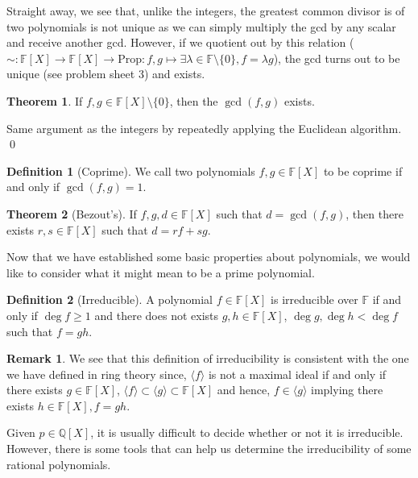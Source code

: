 \documentclass[
]{article}
\theoremstyle{definition}
\newtheorem{theorem}{Theorem}
\newtheorem*{remark}{Remark}
\theoremstyle{definition}
\newtheorem{definition}{Definition}[section]
\begin{document}
Straight away, we see that, unlike the integers, the greatest common
divisor is of two polynomials is not unique as we can simply multiply
the gcd by any scalar and receive another gcd. However, if we quotient
out by this relation
(\(\sim : \mathbb{F}[X] \to \mathbb{F}[X] \to \text{Prop} : f, g \mapsto \exists \lambda \in \mathbb{F} \setminus \{0\}, f = \lambda g\)),
the gcd turns out to be unique (see problem sheet 3) and exists.

\begin{theorem}
  If \(f, g \in \mathbb{F}[X] \setminus \{0\}\), then the \(\gcd(f, g)\) exists.
\end{theorem}
\proof

Same argument as the integers by repeatedly applying the Euclidean
algorithm. \qed

\begin{definition}[Coprime]
  We call two polynomials \(f, g \in \mathbb{F}[X]\) to be coprime if and only if
  \(\gcd(f, g) = 1\).
\end{definition}

\begin{theorem}[Bezout's]
  If \(f, g, d \in \mathbb{F}[X]\) such that \(d = \gcd(f, g)\), then there 
  exists \(r, s \in \mathbb{F}[X]\) such that \(d = r f + s g\).
\end{theorem}

Now that we have established some basic properties about polynomials, we
would like to consider what it might mean to be a prime polynomial.

\begin{definition}[Irreducible]
  A polynomial \(f \in \mathbb{F}[X]\) is irreducible over \(\mathbb{F}\) if 
  and only if \(\deg f \ge 1\) and there does not exists 
  \(g, h \in \mathbb{F}[X]\), \(\deg g, \deg h < \deg f\) such that \(f = gh\). 
\end{definition}
\begin{remark}
  We see that this definition of irreducibility is consistent with the one we 
  have defined in ring theory since, \(\langle f \rangle\) is not a maximal 
  ideal if and only if there exists \(g \in \mathbb{F}[X]\), 
  \(\langle f \rangle \subset \langle g \rangle \subset \mathbb{F}[X]\) and 
  hence, \(f \in \langle g \rangle\) implying there exists 
  \(h \in \mathbb{F}[X], f = gh\).
\end{remark}

Given \(p \in \mathbb{Q}[X]\), it is usually difficult to decide whether
or not it is irreducible. However, there is some tools that can help us
determine the irreducibility of some rational polynomials.
\end{document}
